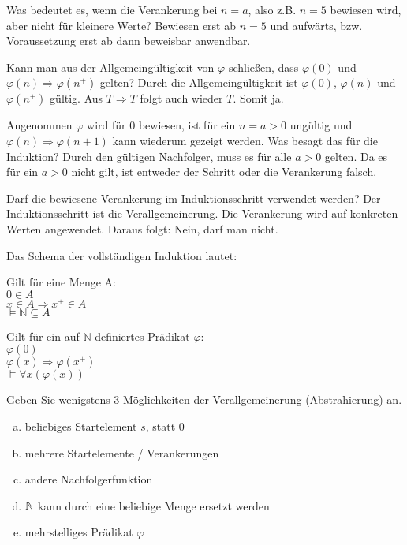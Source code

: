 \begin{card}
	Was bedeutet es, wenn die Verankerung bei $n=a$, also z.B. $n=5$ bewiesen wird, aber nicht für kleinere Werte?
	\hr
	Bewiesen erst ab $n=5$ und aufwärts, bzw. Voraussetzung erst ab dann beweisbar anwendbar.
\end{card}

\begin{card}
	Kann man aus der Allgemeingültigkeit von $\varphi$ schließen, dass $\varphi (0)$ und $\varphi (n)\Rightarrow \varphi (n^+)$ gelten?
	\hr
  Durch die Allgemeingültigkeit ist $\varphi(0)$, $\varphi(n)$ und $\varphi(n^+)$ gültig. Aus $T \Rightarrow T$ folgt auch wieder $T$. Somit ja.
\end{card}

\begin{card}
	Angenommen $\varphi$ wird für 0 bewiesen, ist für ein $n= a > 0$ ungültig und $\varphi(n) \Rightarrow \varphi(n+1)$ kann wiederum gezeigt werden. Was besagt das für die Induktion?
	\hr
	Durch den gültigen Nachfolger, muss es für alle $a > 0$ gelten. Da es für ein $a > 0$ nicht gilt, ist entweder der
	Schritt oder die Verankerung falsch.
\end{card}

\begin{card}
	Darf die bewiesene Verankerung im Induktionsschritt verwendet werden?
	\hr
	Der Induktionsschritt ist die Verallgemeinerung. Die Verankerung wird auf konkreten Werten angewendet. Daraus folgt: Nein, darf man nicht.
\end{card}

\begin{card}
	Das Schema der vollständigen Induktion lautet:\\
  \begin{minipage}[t]{0.48\textwidth}
    Gilt für eine Menge A:\\
    $0 \in A$\\
    $x \in A \Rightarrow x^+ \in A$\\
    $\vDash \mathbb{N} \subseteq A$\\
	\end{minipage}
  \begin{minipage}[t]{0.48\textwidth}
    Gilt für ein auf $\mathbb{N}$ definiertes Prädikat $\varphi$:\\
    $\varphi(0)$\\
    $\varphi(x) \Rightarrow \varphi(x^+)$\\
    $\vDash \forall x (\varphi(x))$\\
	\end{minipage}
	Geben Sie wenigstens 3 Möglichkeiten der Verallgemeinerung (Abstrahierung) an.
	\hr
	\begin{enumerate}[a)]
    \item beliebiges Startelement $s$, statt 0
    \item mehrere Startelemente / Verankerungen
    \item andere Nachfolgerfunktion
    \item $\mathbb{N}$ kann durch eine beliebige Menge ersetzt werden
    \item mehrstelliges Prädikat $\varphi$
	\end{enumerate}
\end{card}
